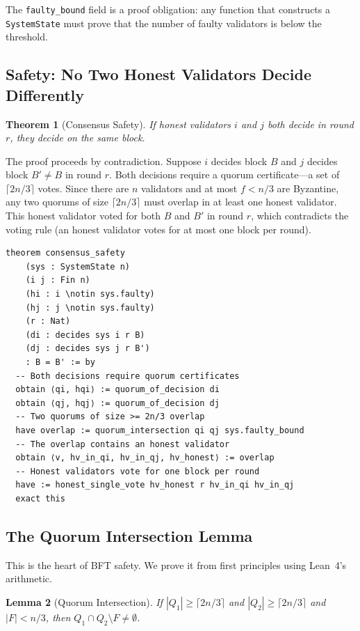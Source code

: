 \documentclass[11pt,a4paper]{article}
\newtheorem{theorem}{Theorem}
\newtheorem{lemma}[theorem]{Lemma}
\begin{document}
The \texttt{faulty\_bound} field is a proof obligation: any function that constructs a
\texttt{SystemState} must prove that the number of faulty validators is below the
threshold.

\subsection{Safety: No Two Honest Validators Decide Differently}

\begin{theorem}[Consensus Safety]
If honest validators $i$ and $j$ both decide in round $r$, they decide on the same block.
\end{theorem}

The proof proceeds by contradiction. Suppose $i$ decides block $B$ and $j$ decides block
$B' \neq B$ in round $r$. Both decisions require a quorum certificate---a set of
$\lceil 2n/3 \rceil$ votes. Since there are $n$ validators and at most $f < n/3$ are
Byzantine, any two quorums of size $\lceil 2n/3 \rceil$ must overlap in at least one
honest validator. This honest validator voted for both $B$ and $B'$ in round $r$, which
contradicts the voting rule (an honest validator votes for at most one block per round).

\begin{lstlisting}[language=Lean,caption={Safety proof sketch in Lean~4}]
theorem consensus_safety
    (sys : SystemState n)
    (i j : Fin n)
    (hi : i \notin sys.faulty)
    (hj : j \notin sys.faulty)
    (r : Nat)
    (di : decides sys i r B)
    (dj : decides sys j r B')
    : B = B' := by
  -- Both decisions require quorum certificates
  obtain ⟨qi, hqi⟩ := quorum_of_decision di
  obtain ⟨qj, hqj⟩ := quorum_of_decision dj
  -- Two quorums of size >= 2n/3 overlap
  have overlap := quorum_intersection qi qj sys.faulty_bound
  -- The overlap contains an honest validator
  obtain ⟨v, hv_in_qi, hv_in_qj, hv_honest⟩ := overlap
  -- Honest validators vote for one block per round
  have := honest_single_vote hv_honest r hv_in_qi hv_in_qj
  exact this
\end{lstlisting}

\subsection{The Quorum Intersection Lemma}

This is the heart of BFT safety. We prove it from first principles using Lean~4's
arithmetic.

\begin{lemma}[Quorum Intersection]
If $|Q_1| \geq \lceil 2n/3 \rceil$ and $|Q_2| \geq \lceil 2n/3 \rceil$ and $|F| < n/3$,
then $Q_1 \cap Q_2 \setminus F \neq \emptyset$.
\end{lemma}
\end{document}
